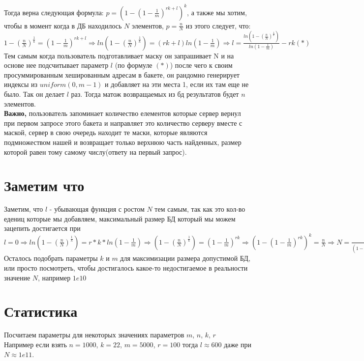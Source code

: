 \documentclass{revtex4}
\begin{document}
Тогда верна следующая формула: $p = (1 - (1-\frac{1}{m})^{rk + l})^{k}$, а также мы хотим, чтобы в момент когда в ДБ находилось $N$ элементов, $p = \frac{n}{N}$ из этого следует, что: 
$1 - (\frac{n}{N})^{\frac{1}{k}} = (1 - \frac{1}{m})^{rk + l} \Rightarrow ln(1 - (\frac{n}{N})^{\frac{1}{k}}) = (rk + l) ln (1 - \frac{1}{m}) \Rightarrow l = \frac{ln(1-(\frac{n}{N})^{\frac{1}{k}})}{ln(1-\frac{1}{m})} - rk (*)$ \\

Тем самым когда пользователь подготавливает маску он запрашивает N и на основе нее подсчитывает параметр $l$ (по формуле $(*)$) после чего к своим просуммированным хешированным адресам в бакете, он рандомно генерирует индексы из $uniform(0, m- 1)$ и добавляет на эти места 1, если их там еще не было. Так он делает $l$ раз. 
Тогда матож возвращаемых из бд результатов будет $n$ элементов. \\ 
\textbf{Важно,} пользователь запоминает количество елементов которые сервер вернул при первом запросе этого бакета и направляет это количество серверу вместе с маской, сервер в свою очередь находит те маски, которые являются подмножеством нашей и возвращает только верхнюю часть найденных, размер которой равен тому самому числу(ответу на первый запрос).

\section*{Заметим что}
Заметим, что $l$ - убывающая функция с ростом $N$ тем самым, так как это кол-во едениц которые мы добавляем, максимальный размер БД который мы можем зацепить достигается при 
$l = 0 \Rightarrow ln(1- (\frac{n}{N})^{\frac{1}{k}}) = r*k* ln(1-\frac{1}{m}) \Rightarrow (1 - (\frac{n}{N})^{\frac{1}{k}}) = (1 - \frac{1}{m})^{rk} \Rightarrow (1 - (1 - \frac{1}{m})^{rk})^{k} = \frac{n}{N} \Rightarrow N = \frac{n}{(1 - (1 - \frac{1}{m})^{rk})^{k}}$ 
Осталось подобрать параметры $k$ и $m$ для максимизации размера допустимой БД, или просто посмотреть, чтобы достигалось какое-то недостигаемое в реальности значение $N$, например $1e10$ 

\section*{Статистика}
Посчитаем параметры для некоторых значениях параметров $m$, $n$, $k$, $r$ \\ 
Например если взять $n = 1000$, $k = 22$, $m = 5000$, $r = 100$ тогда $l \approx 600$ даже при $N \approx 1e11$.
\end{document}
